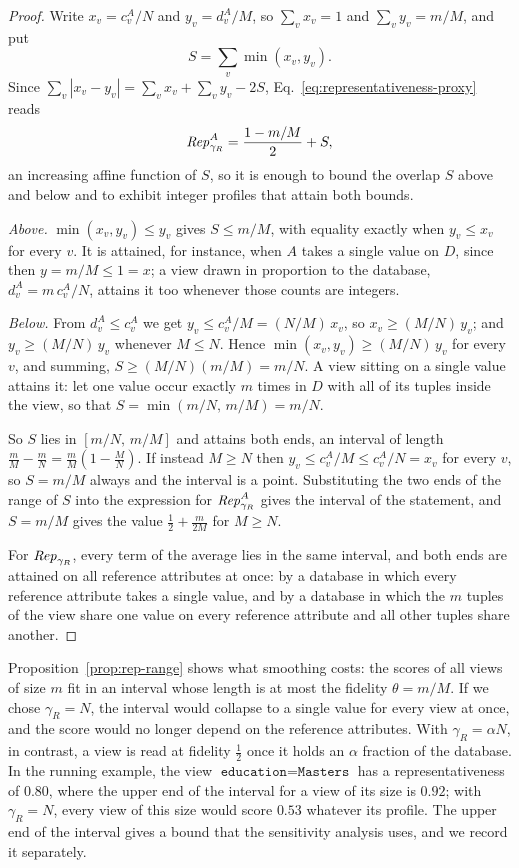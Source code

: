 \begin{proof}
Write $x_v=c^A_v/N$ and $y_v=d^A_v/M$, so $\sum_v x_v=1$ and $\sum_v y_v=m/M$, and put
\[
S=\sum_v\min(x_v,y_v) .
\]
Since $\sum_v|x_v-y_v|=\sum_v x_v+\sum_v y_v-2S$, Eq.~\eqref{eq:representativeness-proxy} reads
\[
\mathit{Rep}^A_{\gamma_R}=\frac{1-m/M}{2}+S ,
\]
an increasing affine function of $S$, so it is enough to bound the overlap $S$ above and
below and to exhibit integer profiles that attain both bounds.

\emph{Above.} $\min(x_v,y_v)\le y_v$ gives $S\le m/M$, with equality exactly when $y_v\le x_v$ for
every $v$. It is attained, for instance, when $A$ takes a single value on $D$, since
then $y=m/M\le1=x$; a view drawn in proportion to the database, $d^A_v=m\,c^A_v/N$, attains it too
whenever those counts are integers.

\emph{Below.} From $d^A_v\le c^A_v$ we get $y_v\le c^A_v/M=(N/M)\,x_v$, so $x_v\ge(M/N)\,y_v$; and
$y_v\ge(M/N)\,y_v$ whenever $M\le N$. Hence $\min(x_v,y_v)\ge(M/N)\,y_v$ for every $v$, and
summing, $S\ge(M/N)(m/M)=m/N$. A view sitting on a single value attains it: let one value occur
exactly $m$ times in $D$ with all of its tuples inside the view, so that
$S=\min(m/N,\,m/M)=m/N$.

So $S$ lies in $[m/N,\,m/M]$ and attains both ends, an interval of length $\tfrac{m}{M}-\tfrac{m}{N}=\tfrac mM(1-\tfrac MN)$.
If instead $M\ge N$ then $y_v\le c^A_v/M\le c^A_v/N=x_v$ for every $v$, so $S=m/M$ always and the
interval is a point.
Substituting the two ends of the range of $S$ into the expression for $\mathit{Rep}^A_{\gamma_R}$ gives the interval of the statement, and $S=m/M$ gives the value $\tfrac12+\tfrac{m}{2M}$ for $M\ge N$.

For $\mathit{Rep}_{\gamma_R}$, every term of the average lies in the same interval, and both ends are attained on all reference attributes at once: by a database in which every reference attribute takes a single value, and by a database in which the $m$ tuples of the view share one value on every reference attribute and all other tuples share another.
\end{proof}

Proposition~\ref{prop:rep-range} shows what smoothing costs: the scores of all views of size $m$ fit in an interval whose length is at most the fidelity $\theta=m/M$.
If we chose $\gamma_R=N$, the interval would collapse to a single value for every view at once, and the score would no longer depend on the reference attributes.
With $\gamma_R=\alpha N$, in contrast, a view is read at fidelity $\tfrac12$ once it holds an $\alpha$ fraction of the database.
In the running example, the view $\texttt{education}=\texttt{Masters}$ has a representativeness of $0.80$, where the upper end of the interval for a view of its size is $0.92$; with $\gamma_R=N$, every view of this size would score $0.53$ whatever its profile.
The upper end of the interval gives a bound that the sensitivity analysis uses, and we record it separately.

